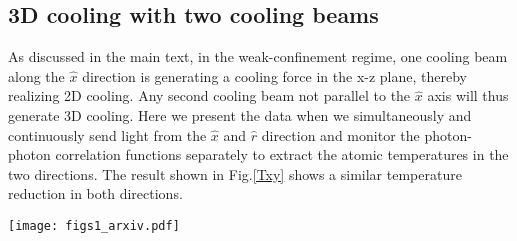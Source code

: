 \documentclass[aps,prl,superscriptaddress,onecloumn,nobibnotes]{revtex4-1}
\begin{document}
 


\subsection*{3D cooling with two cooling beams} 

As discussed in the main text, in the weak-confinement regime, one cooling beam along the $\hat x$ direction is generating a cooling force in the x-z plane, thereby realizing 2D cooling. Any second cooling beam not parallel to the $\hat x$  axis will thus generate 3D cooling. Here we present the data when we simultaneously and continuously send light
from the $\hat x$ and $\hat r$ direction and monitor the photon-photon correlation functions separately to extract the atomic temperatures in the two directions. 
The result shown in Fig.\ref{Txy} shows a similar temperature reduction in both directions. 


\begin{figure*}[!th]
\texttt{[image: figs1\_arxiv.pdf]}
\caption{Temperature in the $\hat{x}$ (red circles) and the $\hat{r}$ direction (black squares) as a function of cooling time when cooling beams are applied along both directions simultaneously.}
\label{Txy}
\end{figure*}
\end{document}
